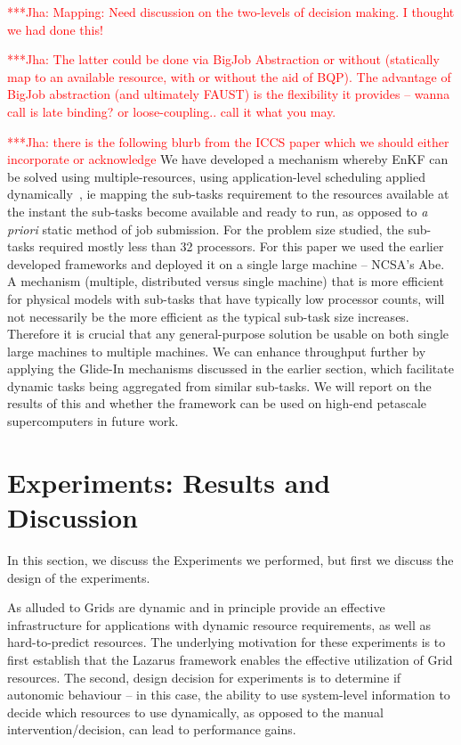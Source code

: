 \documentclass[conference,final]{IEEEtran}
\newcommand{\jhanote}[1]{ {\textcolor{red} { ***Jha: #1 }}}
\newcommand{\jhanote}[1]{}
\begin{document}
\jhanote{Mapping: Need discussion on the two-levels of decision
  making. I thought we had done this!}

\jhanote{The latter could be done via BigJob Abstraction or without
  (statically map to an available resource, with or without the aid of
  BQP).  The advantage of BigJob abstraction (and ultimately FAUST) is
  the flexibility it provides -- wanna call is late binding? or
  loose-coupling..  call it what you may.}

\jhanote{there is the following blurb from the ICCS paper which we
  should either incorporate or acknowledge} We have developed a
mechanism whereby EnKF can be solved using multiple-resources, using
application-level scheduling applied dynamically~\cite{saga_tg08}, ie
mapping the sub-tasks requirement to the resources available at the
instant the sub-tasks become available and ready to run, as opposed to
{\it a priori} static method of job submission.  For the problem size
studied, the sub-tasks required mostly less than 32 processors. For
this paper we used the earlier developed frameworks and deployed it on
a single large machine -- NCSA's Abe. A mechanism (multiple,
distributed versus single machine) that is more efficient for physical
models with sub-tasks that have typically low processor counts, will
not necessarily be the more efficient as the typical sub-task size
increases. Therefore it is crucial that any general-purpose solution
be usable on both single large machines to multiple machines.  We can
enhance throughput further by applying the Glide-In mechanisms
discussed in the earlier section, which facilitate dynamic tasks being
aggregated from similar sub-tasks. We will report on the results of
this and whether the framework can be used on high-end petascale
supercomputers in future work.


\section{Experiments: Results and Discussion}

In this section, we discuss the Experiments we performed, but first
we discuss the design of the experiments.

As alluded to Grids are dynamic and in principle provide an effective
infrastructure for applications with dynamic resource requirements, as
well as hard-to-predict resources. The underlying motivation for these
experiments is to first establish that the Lazarus framework enables
the effective utilization of Grid resources. The second, design
decision for experiments is to determine if autonomic behaviour -- in
this case, the ability to use system-level information to decide which
resources to use dynamically, as opposed to the manual
intervention/decision, can lead to performance gains.
\end{document}

